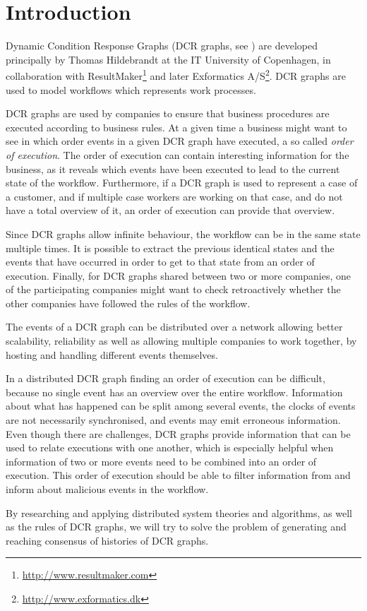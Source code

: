 \chapter{Introduction}
	Dynamic Condition Response Graphs (DCR graphs, see \cite{hildebrandt2011declarative}) are developed principally by Thomas Hildebrandt at the IT University of Copenhagen, in collaboration with ResultMaker\footnote{\url{http://www.resultmaker.com}} and later Exformatics A/S\footnote{\url{http://www.exformatics.dk}}. DCR graphs are used to model workflows which represents work processes.
	
	\newpar DCR graphs are used by companies to ensure that business procedures are executed according to business rules. At a given time a business might want to see in which order events in a given DCR graph have executed, a so called \textit{order of execution}. The order of execution can contain interesting information for the business, as it reveals which events have been executed to lead to the current state of the workflow. Furthermore, if a DCR graph is used to represent a case of a customer, and if multiple case workers are working on that case, and do not have a total overview of it, an order of execution can provide that overview. 
	
	Since DCR graphs allow infinite behaviour, the workflow can be in the same state multiple times. It is possible to extract the previous identical states and the events that have occurred in order to get to that state from an order of execution. Finally, for DCR graphs shared between two or more companies, one of the participating companies might want to check retroactively whether the other companies have followed the rules of the workflow.
	
	\newpar The events of a DCR graph can be distributed over a network allowing better scalability, reliability as well as allowing multiple companies to work together, by hosting and handling different events themselves.
	
	\newpar In a distributed DCR graph finding an order of execution can be difficult, because no single event has an overview over the entire workflow. Information about what has happened can be split among several events, the clocks of events are not necessarily synchronised, and events may emit erroneous information. Even though there are challenges, DCR graphs provide information that can be used to relate executions with one another, which is especially helpful when information of two or more events need to be combined into an order of execution. This order of execution should be able to filter information from and inform about malicious events in the workflow. 

	\newpar By researching and applying distributed system theories and algorithms, as well as the rules of DCR graphs, we will try to solve the problem of generating and reaching consensus of histories of DCR graphs.